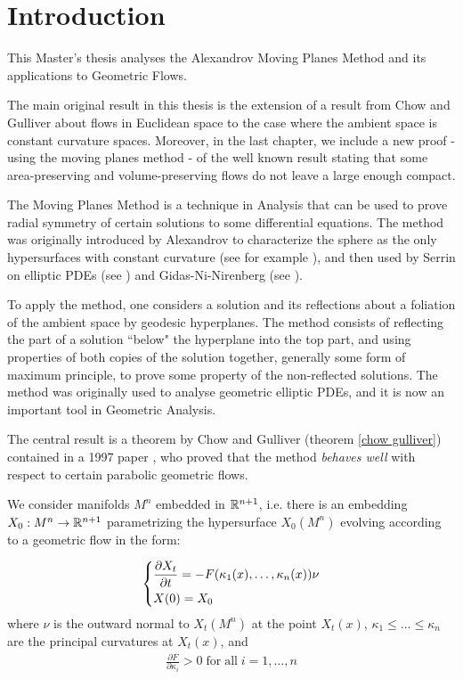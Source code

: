 \chapter*{Introduction}

This Master's thesis analyses the Alexandrov Moving Planes Method and its applications to Geometric Flows. 

The main original result in this thesis is the extension of a result from Chow and Gulliver about flows in Euclidean space to  the case where the ambient space is constant curvature spaces. Moreover, in the last chapter, we include a new proof - using the moving planes method - of the well known result stating that some area-preserving and volume-preserving flows do not leave a large enough compact. 

The Moving Planes Method is a technique in Analysis that can be used to prove radial symmetry of certain solutions to some differential equations.  The method was originally introduced by Alexandrov to characterize the sphere as the only hypersurfaces with constant curvature (see for example \cite{alexandrovexample}), and then used by Serrin on elliptic PDEs (see \cite{serrin1971}) and Gidas-Ni-Nirenberg (see \cite{GidasNirenberg}). 

To apply the method, one considers a solution and its reflections about a foliation of the ambient space by geodesic hyperplanes. The method consists of reflecting the part of a solution ``below" the hyperplane into the top part, and using properties of both copies of the solution together, generally some form of maximum principle, to prove some property of the non-reflected solutions. The method was originally used to analyse geometric elliptic PDEs, and it is now an important tool in Geometric Analysis.

The central result is a theorem by Chow and Gulliver (theorem \ref{chow gulliver}) contained in a 1997 paper \cite{Chow}, who proved that the method \textit{behaves well} with respect to certain parabolic geometric flows. 


We consider manifolds $M^n$ embedded in $\mathbb{R}^{n+1}$, i.e. there is an embedding $X_0 : M^n \rightarrow \mathbb{R}^{n+1}$ parametrizing the hypersurface $X_0(M^n)$ evolving according to a geometric flow in the form: 

\begin{align*}
	\begin{dcases}
		\frac{\partial X_t}{\partial t} = - F(\kappa_1(x), \dots , \kappa_n(x)) \nu\\
		X(0)= X_0
	\end{dcases} 
\end{align*}
where $\nu$ is the outward normal to $X_t(M^n)$ at the point $X_t(x)$, $\kappa_1\leq \dots \leq \kappa_n$ are the principal curvatures at $X_t(x)$, and 
\begin{align*}
	\frac{\partial F}{\partial \kappa_i} > 0 \mathrm{\; for \; all } \; i=1,\dots, n
\end{align*}

